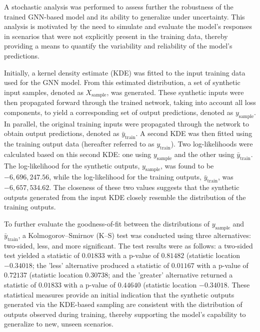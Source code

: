 A stochastic analysis was performed to assess further the robustness of the trained GNN-based model and its ability to generalize under uncertainty. This analysis is motivated by the need to simulate and evaluate the model's responses in scenarios that were not explicitly present in the training data, thereby providing a means to quantify the variability and reliability of the model's predictions.

Initially, a kernel density estimate (KDE) was fitted to the input training data used for the GNN model. From this estimated distribution, a set of synthetic input samples, denoted as \( X_{\text{sample}} \), was generated. These synthetic inputs were then propagated forward through the trained network, taking into account all loss components, to yield a corresponding set of output predictions, denoted as \( y_{\text{sample}} \). In parallel, the original training inputs were propagated through the network to obtain output predictions, denoted as \(\bar{y}_{\text{train}}\). A second KDE was then fitted using the training output data (hereafter referred to as \(y_{\text{train}}\)). Two log-likelihoods were calculated based on this second KDE: one using \(y_{\text{sample}}\) and the other using \(\bar{y}_{\text{train}}\). The log-likelihood for the synthetic outputs, \(y_{\text{sample}}\), was found to be \(-6,696,247.56\), while the log-likelihood for the training outputs, \(\bar{y}_{\text{train}}\), was \(-6,657,534.62\). The closeness of these two values suggests that the synthetic outputs generated from the input KDE closely resemble the distribution of the training outputs.

To further evaluate the goodness-of-fit between the distributions of \( y_{\text{sample}} \) and \( \bar{y}_{\text{train}} \), a Kolmogorov–Smirnov (K–S) test was conducted using three alternatives: two-sided, less, and more significant. The test results were as follows: a two-sided test yielded a statistic of \( 0.01833 \) with a p-value of \( 0.81482 \) (statistic location \(-0.34018\); the 'less' alternative produced a statistic of \( 0.01167 \) with a p-value of \( 0.72137 \) (statistic location \(0.30738\); and the 'greater' alternative returned a statistic of \( 0.01833 \) with a p-value of \( 0.44640 \) (statistic location \(-0.34018\). These statistical measures provide an initial indication that the synthetic outputs generated via the KDE-based sampling are consistent with the distribution of outputs observed during training, thereby supporting the model's capability to generalize to new, unseen scenarios.




